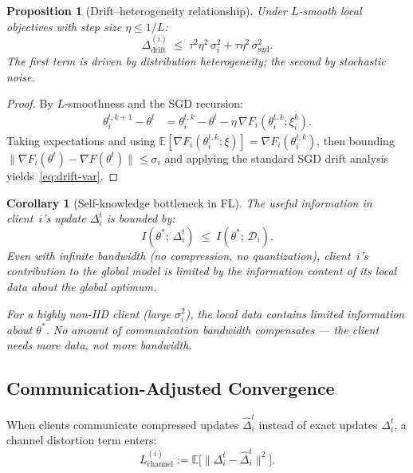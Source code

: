 \documentclass[11pt,a4paper]{article}
\newtheorem{proposition}[theorem]{Proposition}
\newtheorem{corollary}[theorem]{Corollary}
\newcommand{\E}{\mathbb{E}}
\newcommand{\cD}{\mathcal{D}}
\newcommand{\norm}[1]{\|#1\|}
\begin{document}
\begin{proposition}[Drift--heterogeneity relationship]\label{prop:drift-bound}
Under $L$-smooth local objectives with step size $\eta \leq 1/L$:
\begin{equation}\label{eq:drift-var}
  \Delta_{\text{drift}}^{(i)} \;\leq\; \tau^2 \eta^2\,\sigma_i^2 + \tau\eta^2\,\sigma_{\text{sgd}}^2.
\end{equation}
The first term is driven by distribution heterogeneity; the second by
stochastic noise.
\end{proposition}

\begin{proof}
By $L$-smoothness and the SGD recursion:
\begin{align}
  \theta_i^{t,k+1} - \theta^t
  &= \theta_i^{t,k} - \theta^t - \eta\,\nabla F_i(\theta_i^{t,k}; \xi_i^k).
\end{align}
Taking expectations and using $\E[\nabla F_i(\theta_i^{t,k}; \xi)] = \nabla F_i(\theta_i^{t,k})$,
then bounding $\norm{\nabla F_i(\theta^t) - \nabla F(\theta^t)} \leq \sigma_i$
and applying the standard SGD drift analysis~\cite{karimireddy2020}
yields~\eqref{eq:drift-var}.
\end{proof}

\begin{corollary}[Self-knowledge bottleneck in FL]\label{cor:fl-bottleneck}
The useful information in client~$i$'s update $\Delta_i^t$ is bounded by:
\begin{equation}
  I(\theta^*;\, \Delta_i^t) \;\leq\; I(\theta^*;\, \cD_i).
\end{equation}
Even with \emph{infinite bandwidth} (no compression, no quantization),
client~$i$'s contribution to the global model is limited by the information
content of its local data about the global optimum.

For a highly non-IID client (large $\sigma_i^2$), the local data contains
limited information about $\theta^*$. No amount of communication bandwidth
compensates --- the client needs more \emph{data}, not more \emph{bandwidth}.
\end{corollary}

\subsection{Communication-Adjusted Convergence}

When clients communicate compressed updates $\hat{\Delta}_i^t$ instead of
exact updates $\Delta_i^t$, a channel distortion term enters:
\begin{equation}\label{eq:channel-loss}
  L_{\text{channel}}^{(i)} := \E\bigl[\norm{\Delta_i^t - \hat{\Delta}_i^t}^2\bigr].
\end{equation}
\end{document}
